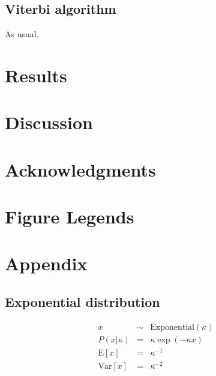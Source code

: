 \documentclass[10pt]{article}
\begin{document}
\subsection{Viterbi algorithm}

As usual.


\newpage
\section{Results}




\section{Discussion}


\newpage
\section{Acknowledgments}



\clearpage
\section{Figure Legends}

\clearpage
\section{Appendix}

\subsection{Exponential distribution}

\begin{eqnarray*}
x & \sim & \mbox{Exponential}(\kappa) \\
P(x|\kappa) & = & \kappa \exp(-\kappa x) \\
\mbox{E}[x] & = & \kappa^{-1} \\
\mbox{Var}[x] & = & \kappa^{-2}
\end{eqnarray*}
\end{document}
